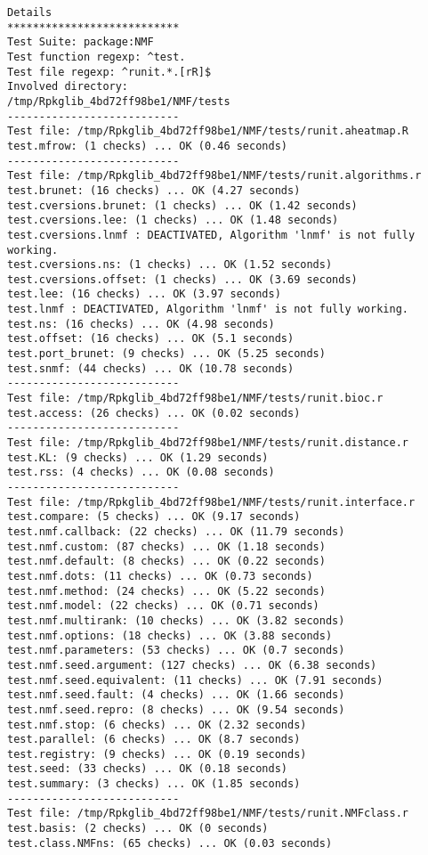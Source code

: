 \documentclass[10pt]{article}
\begin{document}
\begin{verbatim}
Details 
*************************** 
Test Suite: package:NMF 
Test function regexp: ^test. 
Test file regexp: ^runit.*.[rR]$ 
Involved directory: 
/tmp/Rpkglib_4bd72ff98be1/NMF/tests 
--------------------------- 
Test file: /tmp/Rpkglib_4bd72ff98be1/NMF/tests/runit.aheatmap.R 
test.mfrow: (1 checks) ... OK (0.46 seconds)
--------------------------- 
Test file: /tmp/Rpkglib_4bd72ff98be1/NMF/tests/runit.algorithms.r 
test.brunet: (16 checks) ... OK (4.27 seconds)
test.cversions.brunet: (1 checks) ... OK (1.42 seconds)
test.cversions.lee: (1 checks) ... OK (1.48 seconds)
test.cversions.lnmf : DEACTIVATED, Algorithm 'lnmf' is not fully working.
test.cversions.ns: (1 checks) ... OK (1.52 seconds)
test.cversions.offset: (1 checks) ... OK (3.69 seconds)
test.lee: (16 checks) ... OK (3.97 seconds)
test.lnmf : DEACTIVATED, Algorithm 'lnmf' is not fully working.
test.ns: (16 checks) ... OK (4.98 seconds)
test.offset: (16 checks) ... OK (5.1 seconds)
test.port_brunet: (9 checks) ... OK (5.25 seconds)
test.snmf: (44 checks) ... OK (10.78 seconds)
--------------------------- 
Test file: /tmp/Rpkglib_4bd72ff98be1/NMF/tests/runit.bioc.r 
test.access: (26 checks) ... OK (0.02 seconds)
--------------------------- 
Test file: /tmp/Rpkglib_4bd72ff98be1/NMF/tests/runit.distance.r 
test.KL: (9 checks) ... OK (1.29 seconds)
test.rss: (4 checks) ... OK (0.08 seconds)
--------------------------- 
Test file: /tmp/Rpkglib_4bd72ff98be1/NMF/tests/runit.interface.r 
test.compare: (5 checks) ... OK (9.17 seconds)
test.nmf.callback: (22 checks) ... OK (11.79 seconds)
test.nmf.custom: (87 checks) ... OK (1.18 seconds)
test.nmf.default: (8 checks) ... OK (0.22 seconds)
test.nmf.dots: (11 checks) ... OK (0.73 seconds)
test.nmf.method: (24 checks) ... OK (5.22 seconds)
test.nmf.model: (22 checks) ... OK (0.71 seconds)
test.nmf.multirank: (10 checks) ... OK (3.82 seconds)
test.nmf.options: (18 checks) ... OK (3.88 seconds)
test.nmf.parameters: (53 checks) ... OK (0.7 seconds)
test.nmf.seed.argument: (127 checks) ... OK (6.38 seconds)
test.nmf.seed.equivalent: (11 checks) ... OK (7.91 seconds)
test.nmf.seed.fault: (4 checks) ... OK (1.66 seconds)
test.nmf.seed.repro: (8 checks) ... OK (9.54 seconds)
test.nmf.stop: (6 checks) ... OK (2.32 seconds)
test.parallel: (6 checks) ... OK (8.7 seconds)
test.registry: (9 checks) ... OK (0.19 seconds)
test.seed: (33 checks) ... OK (0.18 seconds)
test.summary: (3 checks) ... OK (1.85 seconds)
--------------------------- 
Test file: /tmp/Rpkglib_4bd72ff98be1/NMF/tests/runit.NMFclass.r 
test.basis: (2 checks) ... OK (0 seconds)
test.class.NMFns: (65 checks) ... OK (0.03 seconds)

\end{verbatim}
\end{document}
